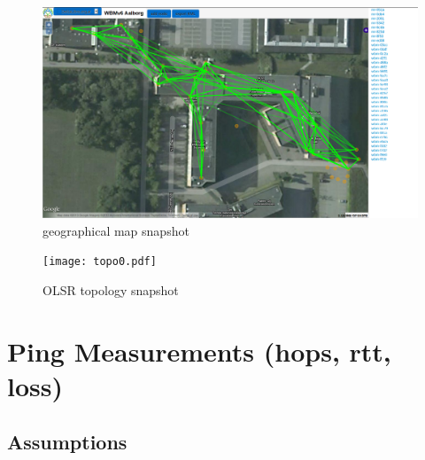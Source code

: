 \documentclass[a4paper,12pt,twoside]{article}
\begin{document}
\begin{figure}[p]
\centering
\includegraphics[width=1.3\textwidth, angle=90]{geographical_map2.png}
\caption{geographical map snapshot}
\label{fig:geomap}
\end{figure}


\immediate{}

\begin{figure}[p]
\centering
\texttt{[image: topo0.pdf]}
\caption{OLSR topology snapshot}
\label{fig:olsr-topo}
\end{figure}

%


\section{Ping Measurements (hops, rtt, loss)}
\label{sec:ping-measurements}

\subsection{Assumptions}
\end{document}
